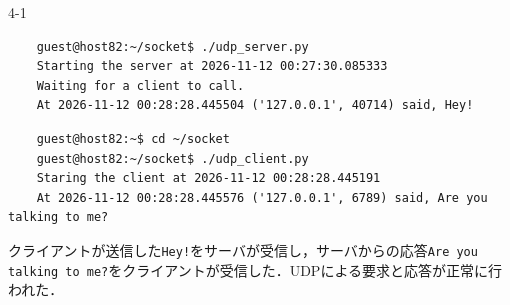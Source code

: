 \begin{maintask}{4-1}
  \begin{termout}[H]
    \caption{udp\_server.py の実行結果}\label{out:udp_server}
    \begin{verbatim}
    guest@host82:~/socket$ ./udp_server.py
    Starting the server at 2026-11-12 00:27:30.085333     
    Waiting for a client to call.                         
    At 2026-11-12 00:28:28.445504 ('127.0.0.1', 40714) said, Hey!  
    \end{verbatim}
  \end{termout}
  \begin{termout}[H]
    \caption{udp\_client.py の実行結果}\label{out:udp_client}
    \begin{verbatim}
    guest@host82:~$ cd ~/socket
    guest@host82:~/socket$ ./udp_client.py                                                                        
    Staring the client at 2026-11-12 00:28:28.445191                                                              
    At 2026-11-12 00:28:28.445576 ('127.0.0.1', 6789) said, Are you talking to me?    
    \end{verbatim}
  \end{termout}

  クライアントが送信した\texttt{Hey!}をサーバが受信し，サーバからの応答\texttt{Are you talking to me?}をクライアントが受信した．UDPによる要求と応答が正常に行われた．
\end{maintask}
